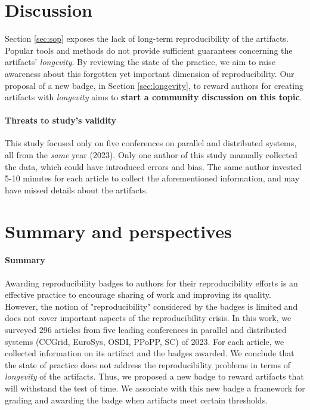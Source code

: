 \documentclass[sigconf,natbib=false]{acmart}
\newcommand{\todo}[1]{{\color{red}{TODO: #1}}}
\begin{document}

\section{Discussion}\label{sec:discussion}

Section \ref{sec:sop} exposes the lack of long-term reproducibility of the artifacts.
Popular tools and methods do not provide sufficient guarantees concerning the artifacts' \emph{longevity}.
By reviewing the state of the practice, we aim to raise awareness about this forgotten yet important dimension of reproducibility.
Our proposal of a new badge, in Section \ref{sec:longevity}, to reward authors for creating artifacts with \emph{longevity} aims to \textbf{start a community discussion on this topic}.


\paragraph{Threats to study's validity}

This study focused only on five conferences on parallel and distributed systems, all from the \emph{same} year (2023).
Only one author of this study manually collected the data, which could have introduced errors and bias.
The same author invested 5-10 minutes for each article to collect the aforementioned information, and may have missed details about the artifacts.


\section{Summary and perspectives}\label{sec:conclu}

\paragraph{Summary}

Awarding reproducibility badges to authors for their reproducibility efforts is an effective practice to encourage sharing of work and improving its quality.
However, the notion of "reproducibility" considered by the badges is limited and does not cover important aspects of the reproducibility crisis.
In this work, we surveyed 296 articles from five leading conferences in parallel and distributed systems (CCGrid, EuroSys, OSDI, PPoPP, SC) of 2023.
For each article, we collected information on its artifact and the badges awarded.
We conclude that the state of practice does not address the reproducibility problems in terms of \emph{longevity} of the artifacts.
Thus, we proposed a new badge to reward artifacts that will withstand the test of time.
We associate with this new badge a framework for grading and awarding the badge when artifacts meet certain thresholds.
\end{document}
